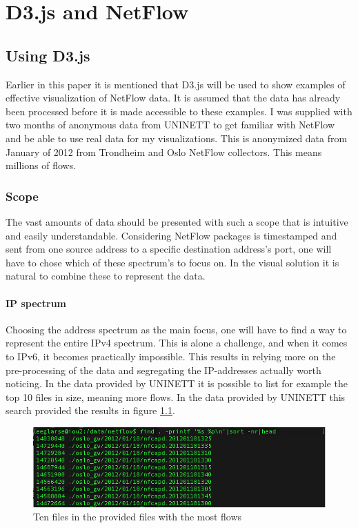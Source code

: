 \chapter{D3.js and NetFlow}
\label{chp:d3andnetflow} 
\section{Using D3.js}
Earlier in this paper it is mentioned that D3.js will be used to show examples of effective visualization of NetFlow data. It is assumed that the data has already been processed before it is made accessible to these examples. I was supplied with two months of anonymous data from UNINETT to get familiar with NetFlow and be able to use real data for my visualizations. This is anonymized data from January of 2012 from Trondheim and Oslo NetFlow collectors. This means millions of flows.

\subsection{Scope}
The vast amounts of data should be presented with such a scope that is intuitive and easily understandable. Considering NetFlow packages is timestamped and sent from one source address to a specific destination address's port, one will have to chose which of these spectrum's to focus on. In the visual solution it is natural to combine these to represent the data. 

\subsubsection{IP spectrum}
Choosing the address spectrum as the main focus, one will have to find a way to represent the entire IPv4 spectrum. This is alone a challenge, and when it comes to IPv6, it becomes practically impossible. This results in relying more on the pre-processing of the data and segregating the IP-addresses actually worth noticing. In the data provided by UNINETT it is possible to list for example the top 10 files in size, meaning more flows. 
In the data provided by UNINETT this search provided the results in figure \ref{topten}.

\begin{figure}[h!]

\includegraphics[scale=0.6]{top10}
\caption{Ten files in the provided files with the most flows}
\label{topten}
\end{figure}

